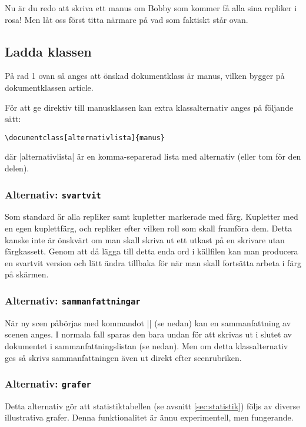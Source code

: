 \documentclass[a4paper,12pt]{article}
\newcommand*{\pack}{\textsf}
\begin{document}
\noindent
Nu är du redo att skriva ett manus om Bobby som kommer få alla sina repliker i rosa! Men låt oss först titta närmare på vad som faktiskt står ovan.

\subsection{Ladda klassen}
På rad 1 ovan så anges att önskad dokumentklass är \pack{manus}, vilken bygger på dokumentklassen \pack{article}.

För att ge direktiv till manusklassen kan extra klassalternativ anges på följande sätt:

\begin{lstlisting}
\documentclass[alternativlista]{manus}
\end{lstlisting}

\noindent
där |alternativlista| är en komma-separerad lista med alternativ (eller tom för den delen).

\subsubsection{Alternativ: \texttt{svartvit}}
\label{alt:svartvit}
Som standard är alla repliker samt kupletter markerade med färg. Kupletter med en egen kuplettfärg, och repliker efter vilken roll som skall framföra dem. Detta kanske inte är önskvärt om man skall skriva ut ett utkast på en skrivare utan färgkassett. Genom att då lägga till detta enda ord i källfilen kan man producera en svartvit version och lätt ändra tillbaka för när man skall fortsätta arbeta i färg på skärmen.

\subsubsection{Alternativ: \texttt{sammanfattningar}}
\label{alt:sammanfattningar}
När ny scen påbörjas med kommandot |\scen| (se nedan) kan en sammanfattning av scenen anges. I normala fall sparas den bara undan för att skrivas ut i slutet av dokumentet i sammanfattningslistan (se nedan). Men om detta klassalternativ ges så skrivs sammanfattningen även ut direkt efter scenrubriken.

\subsubsection{Alternativ: \texttt{grafer}}
\label{alt:grafer}
Detta alternativ gör att statistiktabellen (se avsnitt \ref{sec:statistik}) följs av diverse illustrativa grafer. Denna funktionalitet är ännu experimentell, men fungerande.
\end{document}
